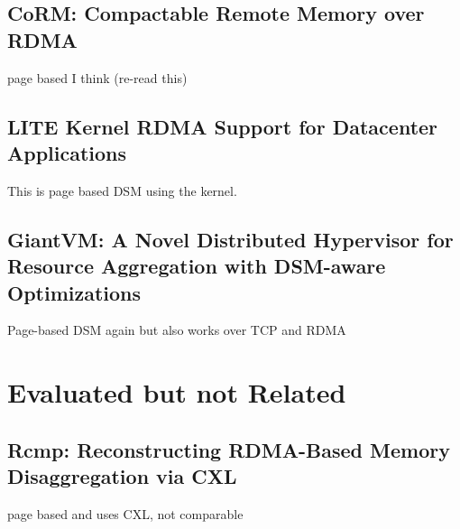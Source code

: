 \documentclass[sigplan,nonacm]{acmart}
\begin{document}
\subsection{CoRM: Compactable Remote Memory over RDMA}
page based I think (re-read this)\cite{Taranov-ICMD-2021}

\subsection{LITE Kernel RDMA Support for Datacenter Applications}
This is page based DSM using the kernel. \cite{Tsai-SOSP-2017}


\subsection {GiantVM: A Novel Distributed Hypervisor for Resource Aggregation with DSM-aware Optimizations}
Page-based DSM again but also works over TCP and RDMA\cite{Jia-ACO-2022}




\section{Evaluated but not Related}
\subsection{Rcmp: Reconstructing RDMA-Based Memory Disaggregation via CXL}
page based and uses CXL, not comparable\cite{Wang-ACO-2024}




\end{document}
